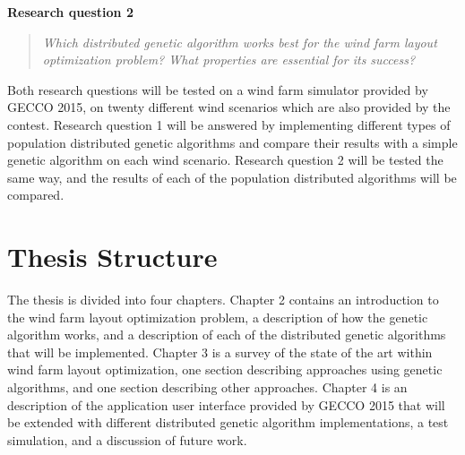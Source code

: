 \noindent \textbf{Research question 2}

\begin{quote}
\textit{Which distributed genetic algorithm works best for the wind farm layout optimization problem? What properties are essential for its success?}
\end{quote}

\noindent Both research questions will be tested on a wind farm simulator provided by GECCO 2015, on twenty different wind scenarios which are also provided by the contest. Research question 1 will be answered by implementing different types of population distributed genetic algorithms and compare their results with a simple genetic algorithm on each wind scenario. Research question 2 will be tested the same way, and the results of each of the population distributed algorithms will be compared.


\section{Thesis Structure}
The thesis is divided into four chapters. Chapter 2 contains an introduction to the wind farm layout optimization problem, a description of how the genetic algorithm works, and a description of each of the distributed genetic algorithms that will be implemented. Chapter 3 is a survey of the state of the art within wind farm layout optimization, one section describing approaches using genetic algorithms, and one section describing other approaches. Chapter 4 is an description of the application user interface provided by GECCO 2015 that will be extended with different distributed genetic algorithm implementations, a test simulation, and a discussion of future work. 